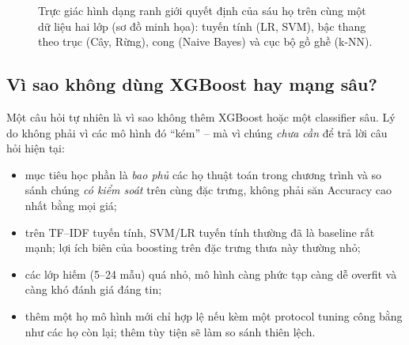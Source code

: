 \begin{figure}[H]
\centering
{}
\caption{Trực giác hình dạng ranh giới quyết định của sáu họ trên cùng một dữ
liệu hai lớp (sơ đồ minh họa): tuyến tính (LR, SVM), bậc thang theo trục (Cây,
Rừng), cong (Naive Bayes) và cục bộ gồ ghề (k-NN).}
\label{fig:classifier-grid}
\end{figure}

\subsection{Vì sao không dùng XGBoost hay mạng sâu?}

Một câu hỏi tự nhiên là vì sao không thêm XGBoost hoặc một classifier sâu. Lý do
không phải vì các mô hình đó ``kém'' -- mà vì chúng \emph{chưa cần} để trả lời
câu hỏi hiện tại:

\begin{itemize}[leftmargin=*]
  \item mục tiêu học phần là \emph{bao phủ} các họ thuật toán trong chương trình
        và so sánh chúng \emph{có kiểm soát} trên cùng đặc trưng, không phải săn
        Accuracy cao nhất bằng mọi giá;
  \item trên TF--IDF tuyến tính, SVM/LR tuyến tính thường đã là baseline rất
        mạnh; lợi ích biên của boosting trên đặc trưng thưa này thường nhỏ;
  \item các lớp hiếm (5--24 mẫu) quá nhỏ, mô hình càng phức tạp càng dễ overfit
        và càng khó đánh giá đáng tin;
  \item thêm một họ mô hình mới chỉ hợp lệ nếu kèm một protocol tuning công bằng
        như các họ còn lại; thêm tùy tiện sẽ làm so sánh thiên lệch.
\end{itemize}

